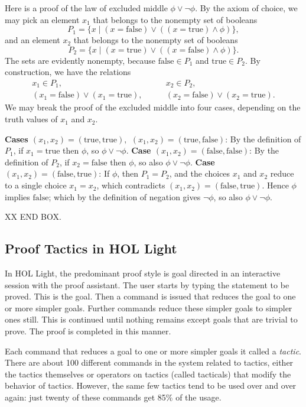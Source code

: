 \documentclass{llncs}
\def\true{\text{true}}
\def\false{\text{false}}
\begin{document}
Here is a proof of the law of excluded middle $\phi\lor \lnot\phi$.
By the axiom of choice, we may pick an element $x_1$ that belongs to
the nonempty set of booleans
\[
P_1 = \{ x \mid (x = \text{false}) \lor ((x = \text{true}) \land \phi)\},
\]
and an element $x_2$ that belongs to the nonempty set of booleans
\[
P_2  = \{x \mid (x = \text{true}) \lor ((x = \text{false}) \land \phi)\}.
\]
The sets are evidently nonempty, because $\false\in P_1$ and $\true\in P_2$.
By construction, we have the relations
\begin{align*}
x_1\in P_1,&\qquad x_2\in P_2,\\
(x_1=\text{false})\lor (x_1 = \text{true}), &\qquad (x_2=\text{false})\lor (x_2 = \text{true}). 
\end{align*}
We may break the proof of the excluded middle into four cases, depending on the
truth values of $x_1$ and $x_2$.

{\bf Cases $(x_1,x_2)=(\true,\true),$ $(x_1,x_2)=(\true,\false)$}: 
By the definition of $P_1$, if $x_1 = \true$ then $\phi$, so $\phi\lor \lnot\phi$.
{\bf Case $(x_1,x_2)=(\false,\false)$}: By the definition of $P_2$,
if $x_2=\false$ then $\phi$, so also $\phi\lor\lnot\phi$.
{\bf Case $(x_1,x_2)=(\false,\true)$}:  If $\phi$, then  $P_1=P_2$, and the choices
$x_1$ and $x_2$ reduce to a single choice $x_1=x_2$, which contradicts $(x_1,x_2)=(\false,\true)$.  Hence $\phi$ implies $\false$; 
which by the definition of negation gives $\lnot\phi$, so also $\phi\lor\lnot\phi$.

XX END BOX.



\subsection{Proof Tactics in HOL Light}

In HOL Light, the predominant proof style is goal directed in an
interactive session with the proof assistant.  The user starts by
typing the statement to be proved.  This is the goal.  Then a command
is issued that reduces the goal to one or more simpler goals.  Further
commands reduce these simpler goals to simpler ones still.  This is
continued until nothing remains except goals that are trivial to
prove.  The proof is completed in this manner.

Each command that reduces a goal to one or more simpler goals it called a 
{\it tactic}.  There are about 100 different commands in the system related
to tactics, either the tactics themselves or operators on tactics (called tacticals) that modify the behavior of tactics.  However, the same few tactics tend to be used over and over again:  just twenty of these commands get 85\% of the usage.
\end{document}
